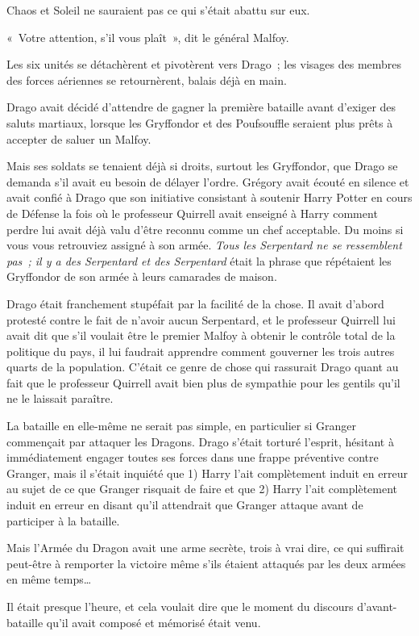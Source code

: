 Chaos et Soleil ne sauraient pas ce qui s'était abattu sur eux.

«~Votre attention, s'il vous plaît~», dit le général Malfoy.

Les six unités se détachèrent et pivotèrent vers Drago~; les visages des membres des forces aériennes se retournèrent, balais déjà en main.

Drago avait décidé d'attendre de gagner la première bataille avant d'exiger des saluts martiaux, lorsque les Gryffondor et des Poufsouffle seraient plus prêts à accepter de saluer un Malfoy.

Mais ses soldats se tenaient déjà si droits, surtout les Gryffondor, que Drago se demanda s'il avait eu besoin de délayer l'ordre. Grégory avait écouté en silence et avait confié à Drago que son initiative consistant à soutenir Harry Potter en cours de Défense la fois où le professeur Quirrell avait enseigné à Harry comment perdre lui avait déjà valu d'être reconnu comme un chef acceptable. Du moins si vous vous retrouviez assigné à son armée. \emph{Tous les Serpentard ne se ressemblent pas~; il y a des Serpentard et des Serpentard} était la phrase que répétaient les Gryffondor de son armée à leurs camarades de maison.

Drago était franchement stupéfait par la facilité de la chose. Il avait d'abord protesté contre le fait de n'avoir aucun Serpentard, et le professeur Quirrell lui avait dit que s'il voulait être le premier Malfoy à obtenir le contrôle total de la politique du pays, il lui faudrait apprendre comment gouverner les trois autres quarts de la population. C'était ce genre de chose qui rassurait Drago quant au fait que le professeur Quirrell avait bien plus de sympathie pour les gentils qu'il ne le laissait paraître.

La bataille en elle-même ne serait pas simple, en particulier si Granger commençait par attaquer les Dragons. Drago s'était torturé l'esprit, hésitant à immédiatement engager toutes ses forces dans une frappe préventive contre Granger, mais il s'était inquiété que 1) Harry l'ait complètement induit en erreur au sujet de ce que Granger risquait de faire et que 2) Harry l'ait complètement induit en erreur en disant qu'il attendrait que Granger attaque avant de participer à la bataille.

Mais l'Armée du Dragon avait une arme secrète, trois à vrai dire, ce qui suffirait peut-être à remporter la victoire même s'ils étaient attaqués par les deux armées en même temps…

Il était presque l'heure, et cela voulait dire que le moment du discours d'avant-bataille qu'il avait composé et mémorisé était venu.

